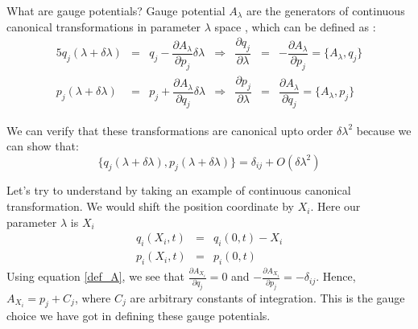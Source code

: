 \documentclass[11pt,a4paper]{article}
\begin{document}
What are gauge potentials? Gauge potential $A_{\lambda}$  are the generators of continuous canonical transformations in parameter $\lambda$ space , which can be defined as :
\begin{alignat}{5}
q_j(\lambda + \delta \lambda) & =& q_j - \dfrac{\partial A_{\lambda}}{\partial p_j} \delta \lambda &\Rightarrow & \dfrac{\partial q_j}{\partial \lambda} &=& -\dfrac{\partial A_{\lambda}}{\partial p_j} = \{A_{\lambda},q_j \} \\
p_j(\lambda + \delta \lambda) & =& p_j + \dfrac{\partial A_{\lambda}}{\partial q_j} \delta \lambda & \Rightarrow & \dfrac{\partial p_j}{\partial \lambda} &=& \dfrac{\partial A_{\lambda}}{\partial q_j}=\{ A_{\lambda},p_j \}
\label{def_A}
\end{alignat}

We can verify that these transformations are canonical upto order $\delta \lambda ^2$ because we can show that:
\begin{equation}
\{q_j(\lambda + \delta \lambda), p_j(\lambda + \delta \lambda)\} = \delta_{ij} + O(\delta \lambda ^2)
\end{equation}

Let's try to understand by taking an example of continuous canonical transformation. We would shift the position coordinate by $X_i$. Here our parameter $\lambda$ is $X_i$
\begin{eqnarray}
 q_i(X_i,t) &=& q_i(0,t) - X_i \\
p_i(X_i,t)&=& p_i(0,t)
\end{eqnarray}
Using equation \ref{def_A}, we see that $\frac{\partial A_{X_i}}{\partial q_j}=0$ and $-\frac{\partial A_{X_i}}{\partial p_j}=-\delta_{ij}$. Hence, $A_{X_i}=p_j + C_j$, where $C_j$ are arbitrary constants of integration. This is the gauge choice we have got in defining these gauge potentials. 

 


\end{document}
